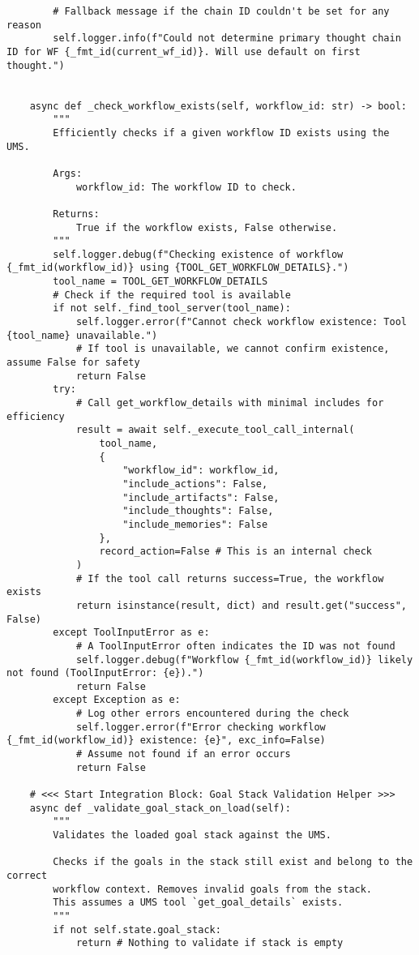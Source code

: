 \documentclass[12pt,a4paper]{article}
\begin{document}
\begin{pageablecode}
\begin{verbatim}
        # Fallback message if the chain ID couldn't be set for any reason
        self.logger.info(f"Could not determine primary thought chain ID for WF {_fmt_id(current_wf_id)}. Will use default on first thought.")


    async def _check_workflow_exists(self, workflow_id: str) -> bool:
        """
        Efficiently checks if a given workflow ID exists using the UMS.

        Args:
            workflow_id: The workflow ID to check.

        Returns:
            True if the workflow exists, False otherwise.
        """
        self.logger.debug(f"Checking existence of workflow {_fmt_id(workflow_id)} using {TOOL_GET_WORKFLOW_DETAILS}.")
        tool_name = TOOL_GET_WORKFLOW_DETAILS
        # Check if the required tool is available
        if not self._find_tool_server(tool_name):
            self.logger.error(f"Cannot check workflow existence: Tool {tool_name} unavailable.")
            # If tool is unavailable, we cannot confirm existence, assume False for safety
            return False
        try:
            # Call get_workflow_details with minimal includes for efficiency
            result = await self._execute_tool_call_internal(
                tool_name,
                {
                    "workflow_id": workflow_id,
                    "include_actions": False,
                    "include_artifacts": False,
                    "include_thoughts": False,
                    "include_memories": False
                },
                record_action=False # This is an internal check
            )
            # If the tool call returns success=True, the workflow exists
            return isinstance(result, dict) and result.get("success", False)
        except ToolInputError as e:
            # A ToolInputError often indicates the ID was not found
            self.logger.debug(f"Workflow {_fmt_id(workflow_id)} likely not found (ToolInputError: {e}).")
            return False
        except Exception as e:
            # Log other errors encountered during the check
            self.logger.error(f"Error checking workflow {_fmt_id(workflow_id)} existence: {e}", exc_info=False)
            # Assume not found if an error occurs
            return False

    # <<< Start Integration Block: Goal Stack Validation Helper >>>
    async def _validate_goal_stack_on_load(self):
        """
        Validates the loaded goal stack against the UMS.

        Checks if the goals in the stack still exist and belong to the correct
        workflow context. Removes invalid goals from the stack.
        This assumes a UMS tool `get_goal_details` exists.
        """
        if not self.state.goal_stack:
            return # Nothing to validate if stack is empty


\end{verbatim}
\end{pageablecode}
\end{document}
